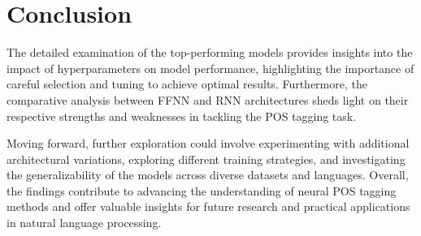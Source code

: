 \section*{Conclusion}

The detailed examination of the top-performing models provides insights into the impact of hyperparameters on model performance, highlighting the importance of careful selection and tuning to achieve optimal results. Furthermore, the comparative analysis between FFNN and RNN architectures sheds light on their respective strengths and weaknesses in tackling the POS tagging task.

Moving forward, further exploration could involve experimenting with additional architectural variations, exploring different training strategies, and investigating the generalizability of the models across diverse datasets and languages. Overall, the findings contribute to advancing the understanding of neural POS tagging methods and offer valuable insights for future research and practical applications in natural language processing.
